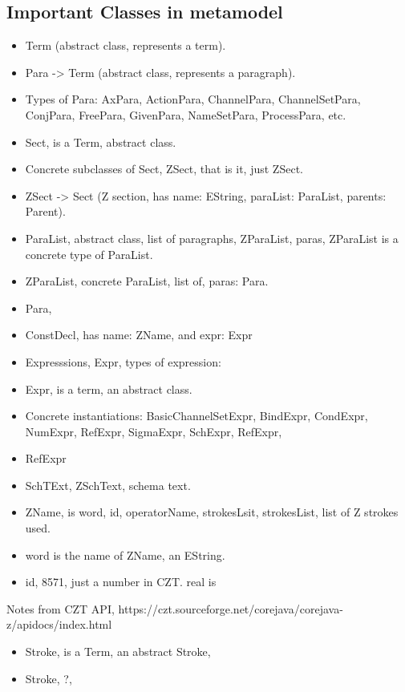 \documentclass{article}
\begin{document}
\subsection{Important Classes in metamodel} 
\begin{itemize}
\item Term (abstract class, represents a term). 
\item Para -> Term (abstract class, represents a paragraph). 
\item Types of Para: AxPara, ActionPara, ChannelPara, ChannelSetPara, ConjPara, FreePara, GivenPara, NameSetPara, ProcessPara, etc.  
\item Sect, is a Term, abstract class. 
\item Concrete subclasses of Sect, ZSect, that is it, just ZSect. 
\item ZSect -> Sect (Z section, has name: EString, paraList: ParaList, parents: Parent).
\item ParaList, abstract class, list of paragraphs, ZParaList, paras, ZParaList is a concrete type of ParaList. 
\item ZParaList, concrete ParaList, list of, paras: Para. 
\item Para, 
\item ConstDecl, has name: ZName, and expr: Expr
\item Expresssions, Expr, types of expression: 
\item Expr, is a term, an abstract class. 
\item Concrete instantiations: BasicChannelSetExpr, BindExpr, CondExpr, NumExpr, RefExpr, SigmaExpr, SchExpr, RefExpr, 
\item RefExpr
\item SchTExt, ZSchText, schema text. 
\item ZName, is word, id, operatorName, strokesLsit, strokesList, list of Z strokes used.
\item word is the name of ZName, an EString. 
\item id, 8571, just a number in CZT. real is 

\end{itemize} 
Notes from CZT API, https://czt.sourceforge.net/corejava/corejava-z/apidocs/index.html

\begin{itemize}
\item Stroke, is a Term, an abstract Stroke, 
\item Stroke, ?, 

\end{itemize} 
\end{document}
